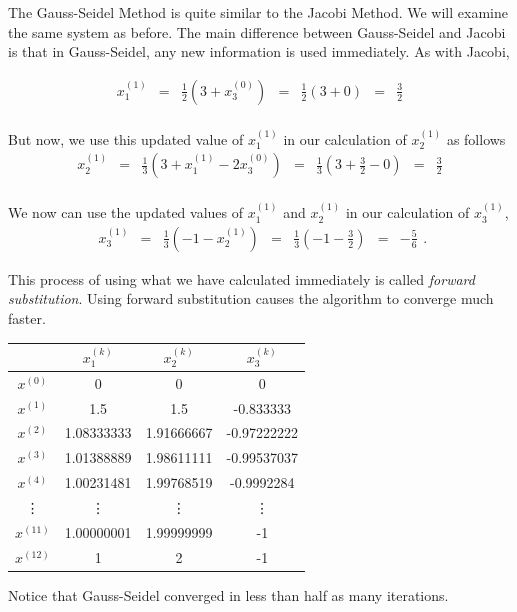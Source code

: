 The Gauss-Seidel Method is quite similar to the Jacobi Method. We will examine
the same system as before. The main difference between Gauss-Seidel and Jacobi
is that in Gauss-Seidel, any new information is used immediately. As with Jacobi,

$$
\begin{matrix}
x^{(1)}_1 & = & \frac{1}{2} ( 3 + x^{(0)}_3)  & = & \frac{1}{2} (3 + 0)     & = & \frac{3}{2} \\
\end{matrix}
$$

But now, we use this updated value of $x^{(1)}_1$ in our calculation of
$x^{(1)}_2$ as follows
$$
\begin{matrix}
x^{(1)}_2 & = & \frac{1}{3} ( 3 + x^{(1)}_1 - 2x^{(0)}_3) & = & \frac{1}{3} (3 + \frac{3}{2} - 0) & = & \frac{3}{2} \\
\end{matrix}
$$

We now can use the updated values of $x^{(1)}_1$ and $x^{(1)}_2$ in our
calculation of $x^{(1)}_3$,
$$
\begin{matrix}
x^{(1)}_3 & = & \frac{1}{3} ( -1 - x^{(1)}_2)       & = & \frac{1}{3} (-1 - \frac{3}{2})    & = & -\frac{5}{6}
\end{matrix}.
$$

This process of using what we have calculated immediately is called
\emph{forward substitution}. Using forward substitution causes the algorithm to
converge much faster.

\begin{center}
    \begin{tabular} {c | c c c}
        & $x^{(k)}_1$ & $x^{(k)}_2$ & $x^{(k)}_3$ \\
        \hline
          $x^{(0)}$ & 0 & 0 & 0 \\
          $x^{(1)}$ & 1.5 & 1.5 & -0.833333 \\
          $x^{(2)}$ & 1.08333333 & 1.91666667 & -0.97222222 \\
          $x^{(3)}$ & 1.01388889 & 1.98611111 & -0.99537037 \\
          $x^{(4)}$ & 1.00231481 & 1.99768519 & -0.9992284 \\
          \vdots    & \vdots    & \vdots     & \vdots     \\
          $x^{(11)}$ & 1.00000001 & 1.99999999 & -1 \\
          $x^{(12)}$ & 1 & 2 & -1 \\
        \end{tabular}
\end{center}
Notice that Gauss-Seidel converged in less than half as many iterations.

